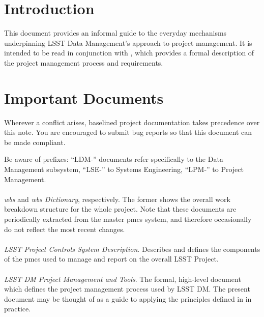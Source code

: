 \section{Introduction}

This document provides an informal guide to the everyday mechanisms underpinning LSST Data Management's approach to project management.
It is intended to be read in conjunction with , which provides a formal description of the project management process and requirements.

\section{Important Documents}
\label{sec:documents}

Wherever a conflict arises, baselined project documentation takes precedence over this note.
You are encouraged to submit bug reports so that this document can be made compliant.

Be aware of prefixes: ``LDM-'' documents refer specifically to the Data Management subsystem, ``LSE-'' to Systems Engineering, ``LPM-'' to Project Management.

\paragraph*{}
\emph{\gls{wbs}} and \emph{\gls{wbs} Dictionary}, respectively.
The former shows the overall work breakdown structure for the whole project.
Note that these documents are periodically extracted from the master \gls{pmcs} system, and therefore occasionally do not reflect the most recent changes.

\paragraph*{}
\emph{LSST Project Controls System Description}.
Describes and defines the components of the \gls{pmcs} used to manage and report on the overall LSST Project.

\paragraph*{}
\emph{LSST DM Project Management and Tools}.
The formal, high-level document which defines the project management process used by LSST DM.
The present document may be thought of as a guide to applying the principles defined in  in practice.

